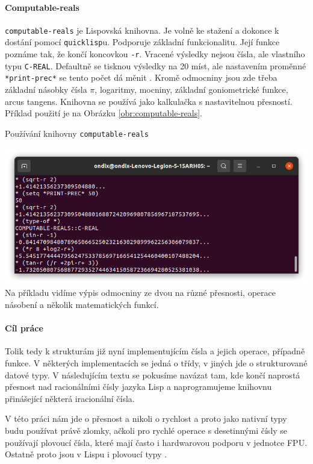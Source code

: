 \paragraph{Computable-reals \cite{gh:cr}}\label{kap:computable-reals}
\texttt{computable-reals} je Lispovská knihovna. Je volně ke stažení a dokonce k dostání pomocí \texttt{quicklisp}u. Podporuje základní funkcionalitu. Její funkce poznáme tak, že končí koncovkou \texttt{-r}. Vracené výsledky nejsou čísla, ale vlastního typu \texttt{C-REAL}. Defaultně se tisknou výsledky na 20 míst, ale nastavením proměnné \texttt{*print-prec*} se tento počet dá měnit \cite{lpb:numbers}. Kromě odmocniny jsou zde třeba základní násobky čísla $\pi$, logaritmy, mocniny, základní goniometrické funkce, arcus tangens. Knihovna se používá jako kalkulačka s nastavitelnou přesností. Příklad použití je na Obrázku \ref{obr:computable-reals}.

\begin{myfigure}{}
\caption{Používání knihovny \texttt{computable-reals}}
\includegraphics[width=\linewidth]{./graphics/computable-reals.png}\label{obr:computable-reals}
Na příkladu vidíme výpis odmocniny ze dvou na různé přesnosti, operace násobení a  několik matematických funkcí.
\end{myfigure}

\paragraph{Cíl práce}
Tolik tedy k strukturám již nyní implementujícím čísla a jejich operace, případně funkce. V některých implementacích se jedná o třídy, v jiných jde o strukturované datové typy. V následujícím textu se pokusíme navázat tam, kde končí naprostá přesnost nad racionálními čísly jazyka Lisp a naprogramujeme knihovnu přinášející některá iracionální čísla.

V této práci nám jde o přesnost a nikoli o rychlost a proto jako nativní typy budu používat právě zlomky, ačkoli pro rychlé operace s desetinnými čísly se používají plovoucí čísla, které mají často i hardwarovou podporu v jednotce FPU. Ostatně proto jsou v Lispu i plovoucí typy \cite{PS:PCL}.


